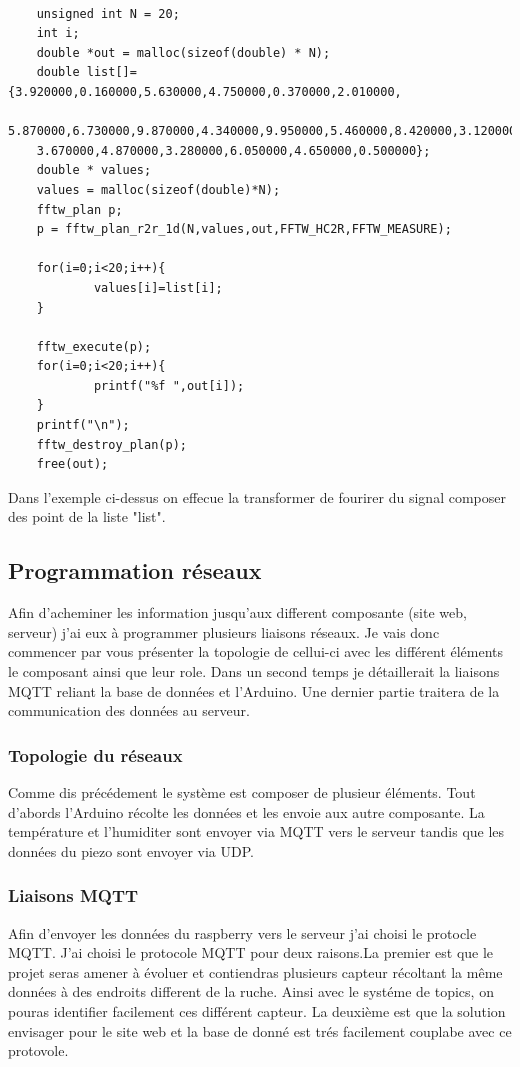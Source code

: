 \documentclass[11pt,french,a4paper]{article}
\begin{document}
\begin{scriptsize}
\begin{lstlisting}

	unsigned int N = 20;
	int i;
	double *out = malloc(sizeof(double) * N);
	double list[]={3.920000,0.160000,5.630000,4.750000,0.370000,2.010000,
	5.870000,6.730000,9.870000,4.340000,9.950000,5.460000,8.420000,3.120000,
	3.670000,4.870000,3.280000,6.050000,4.650000,0.500000};
	double * values;
	values = malloc(sizeof(double)*N);
	fftw_plan p;
	p = fftw_plan_r2r_1d(N,values,out,FFTW_HC2R,FFTW_MEASURE);
	
	for(i=0;i<20;i++){
			values[i]=list[i];
	}
	
	fftw_execute(p);
	for(i=0;i<20;i++){
			printf("%f ",out[i]);
	}
	printf("\n");
	fftw_destroy_plan(p);
	free(out);
\end{lstlisting}
\end{scriptsize}


Dans l'exemple ci-dessus on effecue la transformer de fourirer du signal composer des point de la liste "list". 
\subsection{Programmation réseaux}
Afin d'acheminer les information jusqu'aux different composante (site web, serveur) j'ai eux à programmer plusieurs liaisons réseaux. Je vais donc commencer par vous présenter la topologie de cellui-ci avec les différent éléments le composant ainsi que leur role. Dans un second temps je détaillerait la liaisons MQTT reliant la base de données et l'Arduino. Une dernier partie traitera de la communication des données au serveur.
\subsubsection{Topologie du réseaux}
Comme dis précédement le système est composer de plusieur éléments. Tout d'abords l'Arduino récolte les données et les envoie aux autre composante. La température et l'humiditer sont envoyer via MQTT vers le serveur tandis que les données du piezo sont envoyer via UDP.  
\subsubsection{Liaisons MQTT}
Afin d'envoyer les données du raspberry vers le serveur j'ai choisi le protocle MQTT. J'ai choisi le protocole MQTT pour deux raisons.La premier est que le projet seras amener à évoluer et contiendras plusieurs capteur récoltant la même données à des endroits different de la ruche. Ainsi avec le systéme de topics, on pouras identifier facilement ces différent capteur. La deuxième est que la solution envisager pour le site web et la base de donné est trés facilement couplabe avec ce protovole. 
\end{document}
